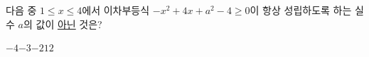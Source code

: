 다음 중 $1\le x\le 4$에서 이차부등식 $-x^2+4x+a^2-4\ge 0$이 항상 성립하도록 하는 실수 $a$의 값이 \underline{아닌} 것은?
\begin{choices32}{$-4$}{$-3$}{$-2$}{$1$}{$2$}\end{choices32}
